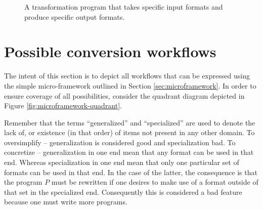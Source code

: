 \documentclass{scrreprt}
\begin{document}
\begin{figure}[h]
  \centering


  \caption{A transformation program that takes specific input formats and produce specific output formats.}
  \label{fig:workflows-framework-spec-in-spec-out}
\end{figure}




\section{Possible conversion workflows}
The intent of this section is to depict all workflows that can be expressed using the simple micro-framework outlined in Section \ref{sec:microframework}. In order to ensure coverage of all possibilities, consider the quadrant diagram depicted in Figure \ref{fig:microframework-quadrant}.

Remember that the terms ``generalized'' and ``specialized'' are used to denote the lack of, or existence (in that order) of items not present in any other domain. To oversimplify -- generalization is considered good and specialization bad. To concretize -- generalization in one end mean that any format can be used in that end. Whereas specialization in one end mean that only one particular set of formats can be used in that end. In the case of the latter, the consequence is that the program $P$ must be rewritten if one desires to make use of a format outside of that set in the specialized end. Consequently this is considered a bad feature because one must write more programs.
\end{document}
